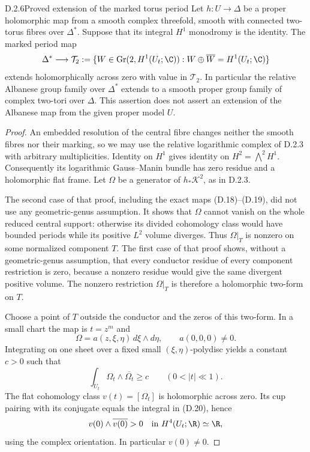 \begin{idstatement}{D.2.6}{Proved extension of the marked torus period}
\label{st:D.2.6}
Let $h:U\to\Delta$ be a proper holomorphic map from a smooth
complex threefold, smooth with connected two-torus fibres over
$\Delta^*$. Suppose that its integral $H^1$ monodromy is the
identity. The marked period map
\[
 \Delta^*\longrightarrow
 \mathcal T_2
 :=\{W\in\operatorname{Gr}(2,H^1(U_t;\C)):
                   W\oplus\overline W=H^1(U_t;\C)\}
\]
extends holomorphically across zero with value in $\mathcal T_2$.
In particular the relative Albanese group family over $\Delta^*$
extends to a smooth proper group family of complex two-tori over
$\Delta$. This assertion does not assert an extension of the
Albanese map from the given proper model $U$.
\end{idstatement}
\begin{proof}
An embedded resolution of the central fibre changes neither
the smooth fibres nor their marking, so we may use the relative
logarithmic complex of D.2.3 with arbitrary multiplicities.
Identity on $H^1$ gives identity on $H^2=\bigwedge^2H^1$.
Consequently its logarithmic Gauss--Manin bundle has zero
residue and a holomorphic flat frame. Let $\Omega$ be a
generator of $h_*\mathscr K^2$, as in D.2.3.

The second case of that proof, including the exact maps
(D.18)--(D.19), did not use any geometric-genus assumption.
It shows that $\Omega$ cannot vanish on the whole reduced
central support: otherwise its divided cohomology class would
have bounded periods while its positive $L^2$ volume diverges.
Thus $\Omega|_T$ is nonzero on some normalized component $T$.
The first case of that proof shows, without a geometric-genus
assumption, that every conductor residue of every component
restriction is zero, because a nonzero residue would give the
same divergent positive volume. The nonzero restriction
$\Omega|_T$ is therefore a holomorphic two-form on $T$.

Choose a point of $T$ outside the conductor and the zeros of
this two-form. In a small chart the map is $t=z^m$ and
\[
 \Omega=a(z,\xi,\eta)\,d\xi\wedge d\eta,
 \qquad a(0,0,0)\ne0.
\]
Integrating on one sheet over a fixed small
$(\xi,\eta)$-polydisc yields a constant $c>0$ such that
\[
 \int_{U_t}\Omega_t\wedge\overline{\Omega_t}\ge c
 \qquad(0<|t|\ll1).
\tag{D.20}
\]
The flat cohomology class $v(t)=[\Omega_t]$ is holomorphic
across zero. Its cup pairing with its conjugate equals the
integral in (D.20), hence
\[
 v(0)\wedge\overline{v(0)}>0
 \quad\hbox{in }H^4(U_t;\R)\simeq\R,
\]
using the complex orientation. In particular $v(0)\ne0$.


\end{proof}
